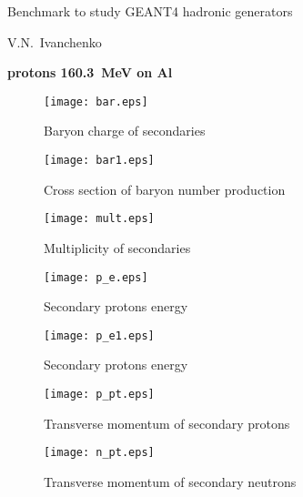 \documentclass[12pt]{article}
\begin{document}
\pagestyle{empty}

\begin{center}
{\large Benchmark to study GEANT4 hadronic generators} 

\vspace*{5mm}
V.N.~Ivanchenko

\vspace*{5mm}


\vspace*{5mm}

{\bf protons 160.3~MeV on Al} 

\vspace*{5mm}


\end{center}


\begin{figure}[htbp]
\caption{Baryon charge of secondaries}
\label{fig1}  
\centerline{\texttt{[image: bar.eps]}}
\end{figure}

\begin{figure}[htbp]
\caption{Cross section of baryon number production}
\label{fig1b}  
\centerline{\texttt{[image: bar1.eps]}}
\end{figure}

\begin{figure}[htbp]
\caption{Multiplicity of secondaries}
\label{fig1a}  
\centerline{\texttt{[image: mult.eps]}}
\end{figure}
\begin{figure}[htbp]
\caption{Secondary protons energy}
\label{fig2} 
\centerline{\texttt{[image: p\_e.eps]}}
\end{figure}
\begin{figure}[htbp]
\caption{Secondary protons energy}
\label{fig2a} 
\centerline{\texttt{[image: p\_e1.eps]}}
\end{figure}

\newpage

\begin{figure}[htbp]
\caption{Transverse momentum of secondary protons} 
\label{fig3}
\centerline{\texttt{[image: p\_pt.eps]}}
\end{figure}

\newpage

\begin{figure}[htbp]
\caption{Transverse momentum of secondary neutrons} 
\label{fig4}
\centerline{\texttt{[image: n\_pt.eps]}}
\end{figure}
\end{document}
